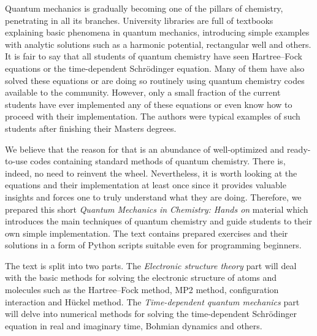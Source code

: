 Quantum mechanics is gradually becoming one of the pillars of chemistry, penetrating in all its branches. University libraries are full of textbooks explaining basic phenomena in quantum mechanics, introducing simple examples with analytic solutions such as a harmonic potential, rectangular well and others. It is fair to say that all students of quantum chemistry have seen Hartree--Fock equations or the time-dependent Schrödinger equation. Many of them have also solved these equations or are doing so routinely using quantum chemistry codes available to the community. However, only a small fraction of the current students have ever implemented any of these equations or even know how to proceed with their implementation. The authors were typical examples of such students after finishing their Masters degrees. 

We believe that the reason for that is an abundance of well-optimized and ready-to-use codes containing standard methods of quantum chemistry. There is, indeed, no need to reinvent the wheel. Nevertheless, it is worth looking at the equations and their implementation at least once since it provides valuable insights and forces one to truly understand what they are doing. Therefore, we prepared this short \textit{Quantum Mechanics in Chemistry: Hands on} material which introduces the main techniques of quantum chemistry and guide students to their own simple implementation. The text contains prepared exercises and their solutions in a form of Python scripts suitable even for programming beginners.

The text is split into two parts. The \textit{Electronic structure theory} part will deal with the basic methods for solving the electronic structure of atoms and molecules such as the Hartree--Fock method, MP2 method, configuration interaction and Hückel method. The \textit{Time-dependent quantum mechanics} part will delve into numerical methods for solving the time-dependent Schrödinger equation in real and imaginary time, Bohmian dynamics and others. 



